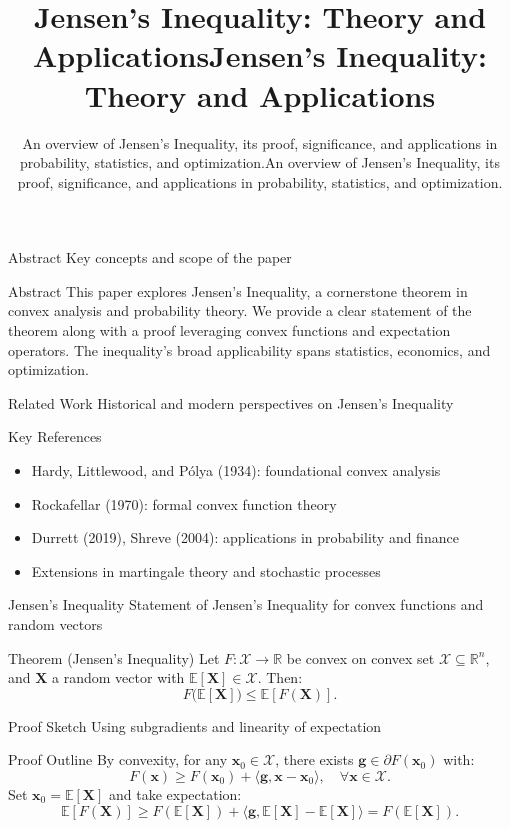 \documentclass{beamer}
\title{Jensen's Inequality: Theory and Applications}
\subtitle{An overview of Jensen's Inequality, its proof, significance, and applications in probability, statistics, and optimization.}
\begin{document}
\title{Jensen's Inequality: Theory and Applications}
\subtitle{An overview of Jensen's Inequality, its proof, significance, and applications in probability, statistics, and optimization.}
\frame{\titlepage}

\begin{frame}{Abstract}
Key concepts and scope of the paper

\begin{block}{Abstract}
This paper explores Jensen's Inequality, a cornerstone theorem in convex analysis and probability theory. We provide a clear statement of the theorem along with a proof leveraging convex functions and expectation operators. The inequality's broad applicability spans statistics, economics, and optimization.
\end{block}
\end{frame}

\begin{frame}{Related Work}
Historical and modern perspectives on Jensen's Inequality

\begin{block}{Key References}
\begin{itemize}
\item Hardy, Littlewood, and Pólya (1934): foundational convex analysis
\item Rockafellar (1970): formal convex function theory
\item Durrett (2019), Shreve (2004): applications in probability and finance
\item Extensions in martingale theory and stochastic processes
\end{itemize}
\end{block}
\end{frame}

\begin{frame}{Jensen's Inequality}
Statement of Jensen's Inequality for convex functions and random vectors

\begin{block}{Theorem (Jensen's Inequality)}
Let \( F: \mathcal{X} \to \mathbb{R} \) be convex on convex set \( \mathcal{X} \subseteq \mathbb{R}^n \), and \( \mathbf{X} \) a random vector with \( \mathbb{E}[\mathbf{X}] \in \mathcal{X} \). Then:
\[ F\big(\mathbb{E}[\mathbf{X}]\big) \leq \mathbb{E}[F(\mathbf{X})]. \]
\end{block}
\end{frame}

\begin{frame}{Proof Sketch}
Using subgradients and linearity of expectation

\begin{block}{Proof Outline}
By convexity, for any \( \mathbf{x}_0 \in \mathcal{X} \), there exists \( \mathbf{g} \in \partial F(\mathbf{x}_0) \) with:
\[ F(\mathbf{x}) \geq F(\mathbf{x}_0) + \langle \mathbf{g}, \mathbf{x} - \mathbf{x}_0 \rangle, \quad \forall \mathbf{x} \in \mathcal{X}. \]
Set \( \mathbf{x}_0 = \mathbb{E}[\mathbf{X}] \) and take expectation:
\[ \mathbb{E}[F(\mathbf{X})] \geq F(\mathbb{E}[\mathbf{X}]) + \langle \mathbf{g}, \mathbb{E}[\mathbf{X}] - \mathbb{E}[\mathbf{X}] \rangle = F(\mathbb{E}[\mathbf{X}]). \]
\end{block}
\end{frame}
\end{document}
